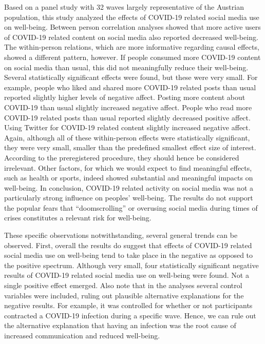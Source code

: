 \documentclass[
  man,mask,floatsintext]{apa7}
\begin{document}
Based on a panel study with 32 waves largely representative of the Austrian population, this study analyzed the effects of COVID-19 related social media use on well-being.
Between person correlation analyses showed that more active users of COVID-19 related content on social media also reported decreased well-being.
The within-person relations, which are more informative regarding causal effects, showed a different pattern, however.
If people consumed more COVID-19 content on social media than usual, this did not meaningfully reduce their well-being.
Several statistically significant effects were found, but these were very small.
For example, people who liked and shared more COVID-19 related posts than usual reported slightly higher levels of negative affect.
Posting more content about COVID-19 than usual slightly increased negative affect.
People who read more COVID-19 related posts than usual reported slightly decreased positive affect.
Using Twitter for COVID-19 related content slightly increased negative affect.
Again, although all of these within-person effects were statistically significant, they were very small, smaller than the predefined smallest effect size of interest.
According to the preregistered procedure, they should hence be considered irrelevant.
Other factors, for which we would expect to find meaningful effects, such as health or sports, indeed showed substantial and meaningful impacts on well-being.
In conclusion, COVID-19 related activity on social media was not a particularly strong influence on peoples' well-being.
The results do not support the popular fears that ``doomscrolling'' or overusing social media during times of crises constitutes a relevant risk for well-being.

These specific observations notwithstanding, several general trends can be observed.
First, overall the results do suggest that effects of COVID-19 related social media use on well-being tend to take place in the negative as opposed to the positive spectrum.
Although very small, four statistically significant negative results of COVID-19 related social media use on well-being were found.
Not a single positive effect emerged.
Also note that in the analyses several control variables were included, ruling out plausible alternative explanations for the negative results.
For example, it was controlled for whether or not participants contracted a COVID-19 infection during a specific wave.
Hence, we can rule out the alternative explanation that having an infection was the root cause of increased communication and reduced well-being.
\end{document}
